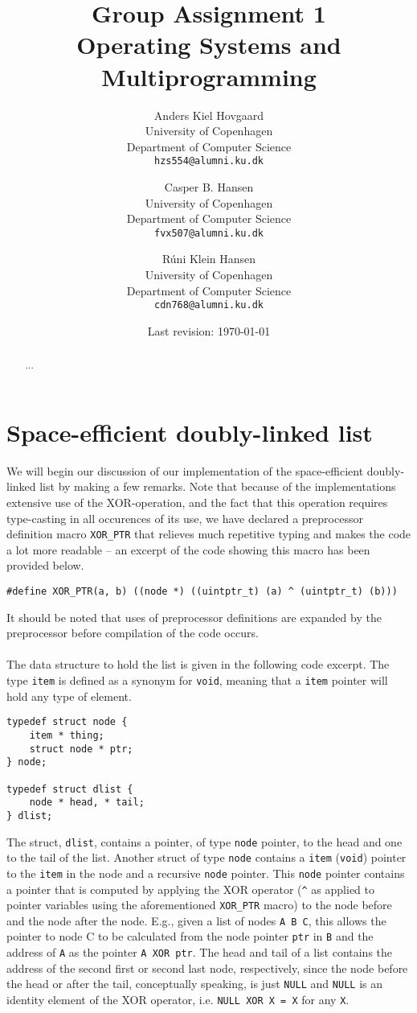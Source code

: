 \documentclass[11pt]{article}
\title
{
    {\Large Group Assignment 1} \\
    Operating Systems and Multiprogramming
}
\author
{
    Anders Kiel Hovgaard \\
    University of Copenhagen \\
    Department of Computer Science \\
    {\tt hzs554@alumni.ku.dk}
    \and
    Casper B. Hansen \\
    University of Copenhagen \\
    Department of Computer Science \\
    {\tt fvx507@alumni.ku.dk}
    \and
    Rúni Klein Hansen \\
    University of Copenhagen \\
    Department of Computer Science \\
    {\tt cdn768@alumni.ku.dk}
}
\date{Last revision: \today}
\newcommand{\code}[1]{{\tt #1}}
\begin{document}
\clearpage
\maketitle
\thispagestyle{empty}
\begin{multicols}{2}
    \begin{abstract}
    ...
    \end{abstract}
    \vfill\columnbreak
    \tableofcontents\vfill
\end{multicols}
\newpage

\section{Space-efficient doubly-linked list}
We will begin our discussion of our implementation of the space-efficient
doubly-linked list by making a few remarks. Note that because of the
implementations extensive use of the XOR-operation, and the fact that this
operation requires type-casting in all occurences of its use, we have declared
a preprocessor definition macro \code{XOR\_PTR} that relieves much repetitive
typing and makes the code a lot more readable -- an excerpt of the code
showing this macro has been provided below.

\begin{lstlisting}
#define XOR_PTR(a, b) ((node *) ((uintptr_t) (a) ^ (uintptr_t) (b)))
\end{lstlisting}

It should be noted that uses of preprocessor definitions are expanded by the
preprocessor before compilation of the code occurs.\\
\\
The data structure to hold the list is given in the following code excerpt. The
type \code{item} is defined as a synonym for \code{void}, meaning that a
\code{item} pointer will hold any type of element.
\begin{lstlisting}
typedef struct node {
    item * thing;
    struct node * ptr;
} node;

typedef struct dlist {
    node * head, * tail;
} dlist;
\end{lstlisting}
The struct, \code{dlist}, contains a pointer, of type \code{node} pointer, to
the head and one to the tail of the list. Another struct of type \code{node}
contains a \code{item} (\code{void}) pointer to the \code{item} in the node and
a recursive \code{node} pointer. This \code{node} pointer contains a pointer
that is computed by applying the XOR operator (\lstinline{^} as applied to
pointer variables using the aforementioned \lstinline{XOR_PTR} macro) to the
node before and the node after the node. E.g., given a list of nodes
\verb|A B C|, this allows the pointer to node C to be calculated from the node
pointer \code{ptr} in \verb|B| and the address of \verb|A| as the pointer
\code{A XOR ptr}. The head and tail of a list contains the address of the second
first or second last node, respectively, since the node before the head or after
the tail, conceptually speaking, is just \code{NULL} and \code{NULL} is an
identity element of the XOR operator, i.e. \code{NULL XOR X = X} for any
\code{X}.
\end{document}
